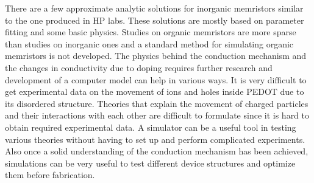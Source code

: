 \begin{doublespace}
There are a few approximate analytic solutions for inorganic memristors similar to the one produced in HP labs. These solutions are mostly based on parameter fitting and some basic physics. Studies on organic memristors are more sparse than studies on inorganic ones and a standard method for simulating organic memristors is not developed. The physics behind the conduction mechanism and the changes in conductivity due to doping requires further research and development of a computer model can help in various ways. It is very difficult to get experimental data on the movement of ions and holes inside PEDOT due to its disordered structure. Theories that explain the movement of charged particles and their interactions with each other are difficult to formulate since it is hard to obtain required experimental data. A simulator can be a useful tool in testing various theories without having to set up and perform complicated experiments. Also once a solid understanding of the conduction mechanism has been achieved, simulations can be very useful to test different device structures and optimize them before fabrication. 


 \end{doublespace}